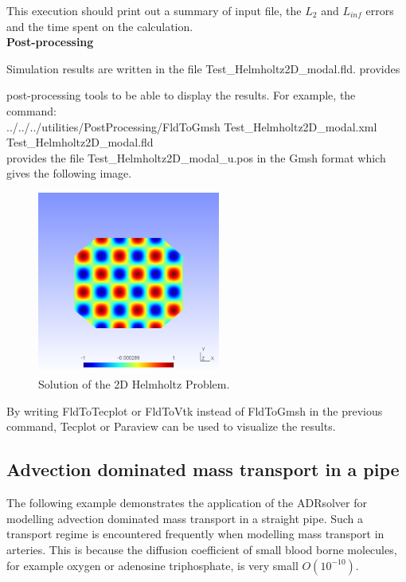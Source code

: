 This execution should print out a summary of input file, the $L_2$ and $L_{inf}$ errors and the time spent on the calculation.\\

\textbf{Post-processing}

Simulation results are written in the file Test\_Helmholtz2D\_modal.fld. \nekpp provides

 post-processing tools to be able to display the results. For example, the command:\\
 
\footnotesize../../../utilities/PostProcessing/FldToGmsh Test\_Helmholtz2D\_modal.xml Test\_Helmholtz2D\_modal.fld \\
 
\normalsize 
provides the file Test\_Helmholtz2D\_modal\_u.pos in the Gmsh format which gives the following image.
 
\begin{figure}[h!]
\begin{center}
\includegraphics[width=6cm]{Figures/Helmholtz2D}
\caption{Solution of the 2D Helmholtz Problem.}
\end{center}
\end{figure}

By writing FldToTecplot or FldToVtk instead of FldToGmsh in the previous command, Tecplot or Paraview can be used to visualize the results.

\subsection{Advection dominated mass transport in a pipe}

The following example demonstrates the application of the ADRsolver for modelling advection dominated mass transport in a straight pipe. 
Such a transport regime is encountered frequently when modelling mass transport in arteries. This is because the diffusion 
coefficient of small blood borne molecules, for example oxygen or adenosine triphosphate, is very small $O(10^{-10})$.

